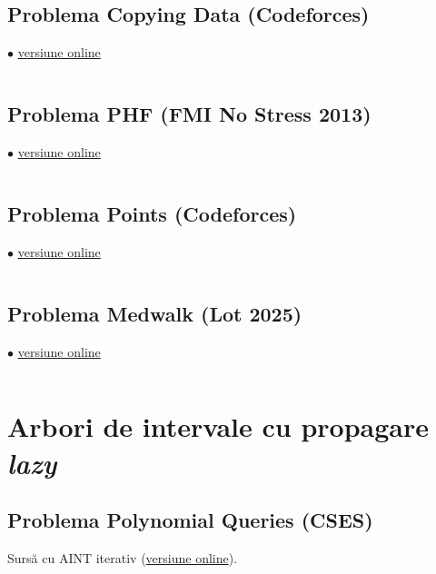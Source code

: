 \inputminted{cpp}{src/segment-trees/sereja-and-brackets.cpp}

\subsection{Problema Copying Data (Codeforces)}
\label{code:copying-data}
$\bullet$
\href{https://codeforces.com/contest/292/submission/281463235}{versiune online}

\inputminted{cpp}{src/segment-trees/copying-data.cpp}

\subsection{Problema PHF (FMI No Stress 2013)}
\label{code:phf}
$\bullet$
\href{https://kilonova.ro/submissions/799391}{versiune online}

\inputminted{cpp}{src/segment-trees/phf.cpp}

\subsection{Problema Points (Codeforces)}
\label{code:points}
$\bullet$
\href{https://codeforces.com/contest/19/submission/281139891}{versiune online}

\inputminted{cpp}{src/segment-trees/points.cpp}

\subsection{Problema Medwalk (Lot  2025)}
\label{code:medwalk}
$\bullet$
\href{https://kilonova.ro/submissions/770116}{versiune online}

\inputminted{cpp}{src/segment-trees/medwalk.cpp}

\section{Arbori de intervale cu propagare \textit{lazy}}

\subsection{Problema Polynomial Queries (CSES)}
\label{code:polynomial-queries}

Sursă cu AINT iterativ (\href{https://github.com/CatalinFrancu/nerdvana/blob/main/problems/cses/1736-polynomial-queries/segtree-iter.cpp}{versiune online}).


